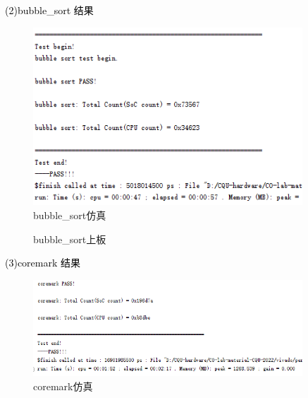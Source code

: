 \textcolor{black}{(2)bubble\_sort 结果}\\
\begin{figure}[htbp]
    \centering
    \includegraphics[width=0.9\textwidth]{image/bubbleS.png}
    \caption{bubble\_sort仿真}
\end{figure}

\begin{figure}[htbp]
    \centering
    \caption{bubble\_sort上板}
\end{figure}

\textcolor{black}{(3)coremark 结果}\\
\begin{figure}[htbp]
    \centering
    \includegraphics[width=0.9\textwidth]{image/coreS.png}
    \caption{coremark仿真}
\end{figure}

